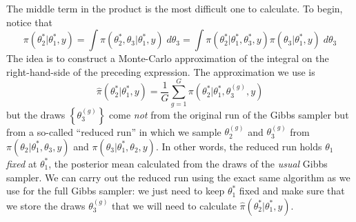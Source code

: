 \documentclass[12pt]{article}
\begin{document}
The middle term in the product is the most difficult one to calculate.
To begin, notice that
\begin{equation*}
  \pi\left( \theta^*_2|\theta^*_1, y \right) = \int \pi(\theta^*_2, \theta_3|\theta_1^*,y) \; d\theta_3 = \int \pi(\theta_2^*|\theta^*_1, \theta^*_3,y)\pi(\theta_3|\theta^*_1,y) \; d\theta_3
\end{equation*}
The idea is to construct a Monte-Carlo approximation of the integral on the right-hand-side of the preceding expression.
The approximation we use is
\begin{equation*}
  \hat{\pi}\left( \theta_2^*|\theta^*_1,y \right) = \frac{1}{G} \sum_{g = 1}^G \pi(\theta_2^*|\theta_1^*, \theta_3^{(g)},y)
\end{equation*}
but the draws $\left\{ \theta_3^{(g)} \right\}$ come \emph{not} from the original run of the Gibbs sampler but from a so-called ``reduced run'' in which we sample $\theta_2^{(g)}$ and $\theta_3^{(g)}$ from $\pi(\theta_2|\theta_1^*,\theta_3, y)$ and $\pi(\theta_3|\theta_1^*,\theta_2,y)$.
In other words, the reduced run holds $\theta_1$ \emph{fixed} at $\theta^*_1$, the posterior mean calculated from the draws of the \emph{usual} Gibbs sampler.
We can carry out the reduced run using the exact same algorithm as we use for the full Gibbs sampler: we just need to keep $\theta^*_1$ fixed and make sure that we store the draws $\theta_3^{(g)}$ that we will need to calculate $\hat{\pi}(\theta^*_2|\theta_1^*,y)$.
\end{document}

